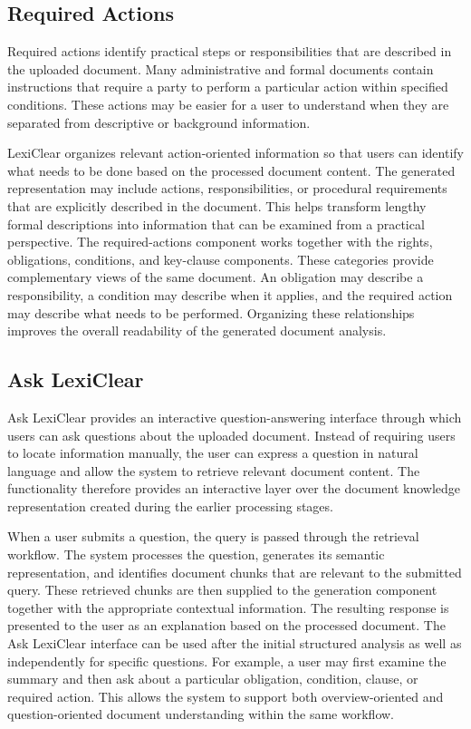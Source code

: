 \documentclass[12pt,a4paper,oneside]{report}
\begin{document}
\subsection{Required Actions}

Required actions identify practical steps or responsibilities that are described in the uploaded document. Many administrative and formal documents contain instructions that require a party to perform a particular action within specified conditions. These actions may be easier for a user to understand when they are separated from descriptive or background information.

LexiClear organizes relevant action-oriented information so that users can identify what needs to be done based on the processed document content. The generated representation may include actions, responsibilities, or procedural requirements that are explicitly described in the document. This helps transform lengthy formal descriptions into information that can be examined from a practical perspective. The required-actions component works together with the rights, obligations, conditions, and key-clause components. These categories provide complementary views of the same document. An obligation may describe a responsibility, a condition may describe when it applies, and the required action may describe what needs to be performed. Organizing these relationships improves the overall readability of the generated document analysis.

\subsection{Ask LexiClear}

Ask LexiClear provides an interactive question-answering interface through which users can ask questions about the uploaded document. Instead of requiring users to locate information manually, the user can express a question in natural language and allow the system to retrieve relevant document content. The functionality therefore provides an interactive layer over the document knowledge representation created during the earlier processing stages.

When a user submits a question, the query is passed through the retrieval workflow. The system processes the question, generates its semantic representation, and identifies document chunks that are relevant to the submitted query. These retrieved chunks are then supplied to the generation component together with the appropriate contextual information. The resulting response is presented to the user as an explanation based on the processed document. The Ask LexiClear interface can be used after the initial structured analysis as well as independently for specific questions. For example, a user may first examine the summary and then ask about a particular obligation, condition, clause, or required action. This allows the system to support both overview-oriented and question-oriented document understanding within the same workflow.
\end{document}
